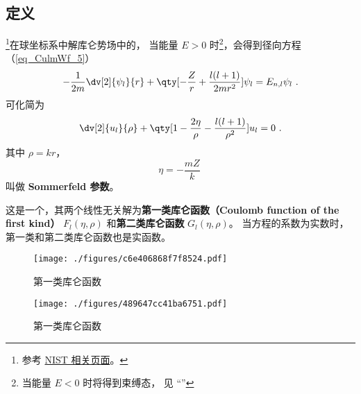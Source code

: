 

\subsection{定义}
\footnote{参考 \href{https://dlmf.nist.gov/33.2}{NIST 相关页面}。}在球坐标系中解库仑势场中的， 当能量 $E > 0$ 时\footnote{当能量 $E < 0$ 时将得到束缚态， 见 “”}，会得到径向方程（\autoref{eq_CulmWf_5}）
\begin{equation}%
-\frac{1}{2m} \dv[2]{\psi_{l}}{r} + \qty[-\frac{Z}{r} + \frac{l(l + 1)}{2mr^2}]\psi_{l} = E_{n, l} \psi_{l}~.
\end{equation}
可化简为
\begin{equation}
\dv[2]{u_l}{\rho} + \qty[1 - \frac{2\eta}{\rho} - \frac{l(l+1)}{\rho^2}]u_l = 0~.
\end{equation}
其中 $\rho = kr$，
\begin{equation}
\eta = -\frac{mZ}{k}~
\end{equation}
叫做 \textbf{Sommerfeld 参数}。

这是一个，其两个线性无关解为\textbf{第一类库仑函数（Coulomb function of the first kind）} $F_l(\eta, \rho)$ 和\textbf{第二类库仑函数} $G_l(\eta, \rho)$。 当方程的系数为实数时， 第一类和第二类库仑函数也是实函数。

\begin{figure}[ht]
\centering
\texttt{[image: ./figures/c6e406868f7f8524.pdf]}
\caption{第一类库仑函数} \label{fig_CulmF_1}
\end{figure}

\begin{figure}[ht]
\centering
\texttt{[image: ./figures/489647cc41ba6751.pdf]}
\caption{第一类库仑函数} \label{fig_CulmF_2}
\end{figure}

